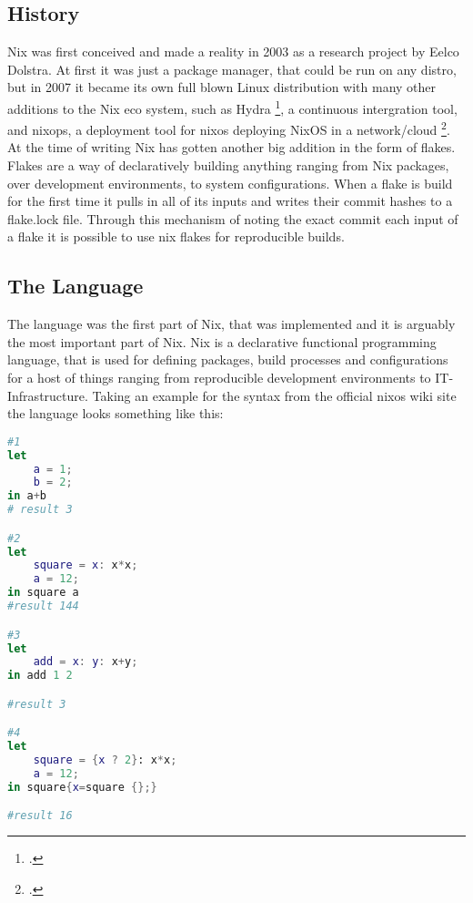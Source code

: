 \subsection{History}
Nix was first conceived and made a reality in 2003 as a research project by Eelco Dolstra. At first it was just a package manager, that could be run on any distro, but in 2007 it became its
own full blown Linux distribution with many other additions to the Nix eco system, such as Hydra \footcite{hydra}, a continuous intergration tool, and nixops,
a deployment tool for nixos deploying NixOS in a network/cloud \footcite{NixOps}. At the time of writing Nix has gotten another big addition in the form of flakes.
Flakes are a way of declaratively building anything ranging from Nix packages, over development environments, to system configurations. When a flake is build for the first time it
pulls in all of its inputs and writes their commit hashes to a flake.lock file. Through this mechanism of noting the exact commit each input of a flake it is possible to use nix flakes for
reproducible builds.

\subsection{The Language}
The language was the first part of Nix, that was implemented and it is arguably the most important part of Nix. Nix is a declarative functional programming language,
that is used for defining packages, build processes and configurations for a host of things ranging from reproducible development environments to IT-Infrastructure.
Taking an example for the syntax from the official nixos wiki site the language looks something like this:

\begin{minipage}{\textwidth}
\begin{lstlisting}[language=Nix, caption={Simple Examples of the Nix Language}]
#1
let
    a = 1;
    b = 2;
in a+b
# result 3

#2
let
    square = x: x*x;
    a = 12;
in square a
#result 144

#3
let 
    add = x: y: x+y;
in add 1 2

#result 3

#4
let
    square = {x ? 2}: x*x;
    a = 12;
in square{x=square {};}

#result 16
\end{lstlisting}
\end{minipage}


